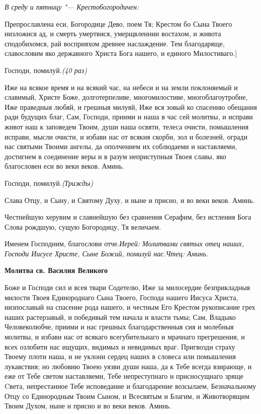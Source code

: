 \itshape В среду и пятницу "--- Крестобогородичен:

\normalfont{}Препрославлена еси, Богородице Дево, поем Тя; Крестом бо Сына Твоего низложися ад, и смерть умертвися, умерщвленнии востахом, и живота сподобихомся, рай восприяхом древнее наслаждение. Тем благодаряще, славословим яко державного Христа Бога нашего, и единого Милостиваго.]





Господи, помилуй.\itshape  (40 раз)



\normalfont{}Иже на всякое время и на всякий час, на небеси и на земли поклоняемый и славимый, Христе Боже, долготерпеливе, многомилостиве, многоблагоутробне, Иже праведныя любяй, и грешныя милуяй, Иже вся зовый ко спасению обещания ради будущих благ, Сам, Господи, приими и наша в час сей молитвы, и исправи живот наш к заповедем Твоим, души наша освяти, телеса очисти, помышления исправи, мысли очисти, и избави нас от всякия скорби, зол и болезней, огради нас святыми Твоими ангелы, да ополчением их соблюдаеми и наставляеми, достигнем в соединение веры и в разум неприступныя Твоея славы, яко благословен еси во веки веков. Аминь.





Господи, помилуй.\itshape  (Трижды)



\normalfont{}Слава Отцу, и Сыну, и Святому Духу, и ныне и присно, и во веки веков. Аминь.

Честнейшую херувим и славнейшую без сравнения Серафим, без истления Бога Слова рождшую, сущую Богородицу, Тя величаем.

Именем Господним, благослови отче.\itshape Иерей\normalfont{}: Молитвами святых отец наших, Господи Иисусе Христе, Сыне Божий, помилуй нас.\itshape Чтец\normalfont{}: Аминь.


\medskip
\bfseries Молитва св. Василия Великого\normalfont{}

Боже и Господи сил и всея твари Содетелю, Иже за милосердие безприкладныя милости Твоея Единороднаго Сына Твоего, Господа нашего Иисуса Христа, низпославый на спасение рода нашего, и честным Его Крестом рукописание грех наших растерзавый, и победивый тем начала и власти тьмы; Сам, Владыко Человеколюбче, приими и нас грешных благодарственныя сия и молебныя молитвы, и избави нас от всякаго всегубительнаго и мрачнаго прегрешения, и всех озлобити нас ищущих, видимых и невидимых враг. Пригвозди страху Твоему плоти наша, и не уклони сердец наших в словеса или помышления лукавствия; но любовию Твоею уязви души наша, да к Тебе всегда взирающе, и еже от Тебе светом наставляеми, Тебе непреступнаго и присносущнаго зряще Cвета, непрестанное Тебе исповедание и благодарение возсылаем, Безначальному Отцу со Единородным Твоим Сыном, и Всесвятым и Благим, и Животворящим Твоим Духом, ныне и присно и во веки веков. Аминь.

\mychapterending